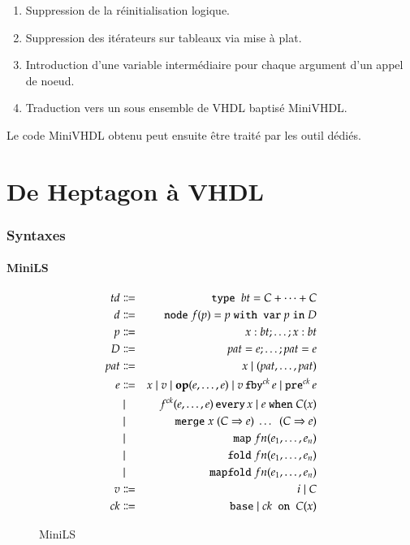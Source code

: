 \documentclass[9pt,a4paper]{article}
\newcommand{\TODO}[1]{}
\newcommand{\LANG}{Heptagon}
\newcommand{\p}[0]{\; \vert \;}
\newcommand{\mybox}[1]{\mbox{\tt{#1}}}
\newcommand{\Node}[4]{\mybox{node} \; f(#1) = #2 \; \mybox{with var} \
  #3 \; \mybox{in} \; #4}
\newcommand{\Op}[2]{\mybox{\bf{op}}(#1,\dots,#2)}
\newcommand{\Fby}[2]{#1 \, \mybox{fby}^{ck} \, #2}
\newcommand{\Pre}[1]{\mybox{pre}^{ck} \, #1}
\newcommand{\Every}[4]{#1^{ck}(#2,\dots,#3) \, \mybox{every} \, #4}
\newcommand{\When}[3]{#1 \; \mybox{when} \; #2(#3)}
\newcommand{\Merge}[5]{\mybox{merge} \; #1 \; (#2 \Rightarrow #3) \; \dots \; \
  (#4 \Rightarrow #5)}
\newcommand{\Base}[0]{\mybox{base}}
\newcommand{\On}[3]{#1 \mybox{ on } #2 (#3)}
\newcommand{\Map}[3]{\mathtt{map} \; #1 n (#2,\dots,#3)}
\newcommand{\Fold}[3]{\mathtt{fold} \; #1 n (#2,\dots,#3)}
\newcommand{\Mapfold}[3]{\mathtt{mapfold} \; #1 n (#2,\dots,#3)}
\begin{document}
\renewcommand{\labelenumi}{\Alph{enumi}}
\begin{enumerate}
\item Suppression de la réinitialisation logique.
\item Suppression des itérateurs sur tableaux via mise à plat.
\item Introduction d'une variable intermédiaire pour chaque argument d'un appel
  de noeud.
\item Traduction vers un sous ensemble de VHDL baptisé MiniVHDL.
\end{enumerate}

Le code MiniVHDL obtenu peut ensuite être traité par les outil dédiés.

\section{De \LANG{} à VHDL}

\subsubsection{Syntaxes}

\TODO{Donner la forme originale sans reset telle qu'avant normalisation ?}

\paragraph{MiniLS}
\label{sec:syn:mls}

\begin{figure}[h]
  \centering
  \begin{eqnarray*}
    td & \Coloneqq & \mybox{type } bt = C + \dots + C \\
    d & \Coloneqq & \Node{p}{p}{p}{D} \\
    p & \Coloneqq & x : bt; \dots; x : bt \\
    D & \Coloneqq & pat = e; \dots; pat = e \\
    pat & \Coloneqq & x \p (pat,\dots,pat) \\
    e & \Coloneqq & x \p v \p \Op{e}{e} \p \Fby{v}{e} \p \Pre{e} \\
    & \p & \Every{f}{e}{e}{x} \p \When{e}{C}{x} \\
    & \p & \Merge{x}{C}{e}{C}{e} \\
    & \p & \Map{f}{e_1}{e_n} \\
    & \p & \Fold{f}{e_1}{e_n} \\
    & \p & \Mapfold{f}{e_1}{e_n} \\
    v & \Coloneqq & i \p C \\
    ck & \Coloneqq & \Base \p \On{ck}{C}{x}
  \end{eqnarray*}
  \caption{MiniLS}
  \label{fig:mls}
\end{figure}
\end{document}
